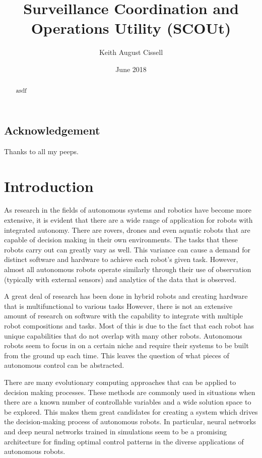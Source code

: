 \documentclass[]{report}
\begin{document}
\title{Surveillance Coordination and Operations Utility (SCOUt)}
\author{Keith August Cissell}
\date{June 2018}

\maketitle

\begin{abstract}
  asdf
\end{abstract}

\section*{Acknowledgement}
Thanks to all my peeps.

\tableofcontents
\newpage



\chapter{Introduction}
As research in the fields of autonomous systems and robotics have become more extensive, it is evident that there are a wide range of application for robots with integrated autonomy.
There are rovers, drones and even aquatic robots that are capable of decision making in their own environments.
The tasks that these robots carry out can greatly vary as well.
This variance can cause a demand for distinct software and hardware to achieve each robot’s given task.
However, almost all autonomous robots operate similarly through their use of observation (typically with external sensors) and analytics of the data that is observed.

A great deal of research has been done in hybrid robots and creating hardware that is multifunctional to various tasks
However, there is not an extensive amount of research on software with the capability to integrate with multiple robot compositions and tasks.
Most of this is due to the fact that each robot has unique capabilities that do not overlap with many other robots.
Autonomous robots seem to focus in on a certain niche and require their systems to be built from the ground up each time.
This leaves the question of what pieces of autonomous control can be abstracted.

There are many evolutionary computing approaches that can be applied to decision making processes.
These methods are commonly used in situations when there are a known number of controllable variables and a wide solution space to be explored.
This makes them great candidates for creating a system which drives the decision-making process of autonomous robots.
In particular, neural networks and deep neural networks trained in simulations seem to be a promising architecture for finding optimal control patterns in the diverse applications of autonomous robots.
\end{document}
